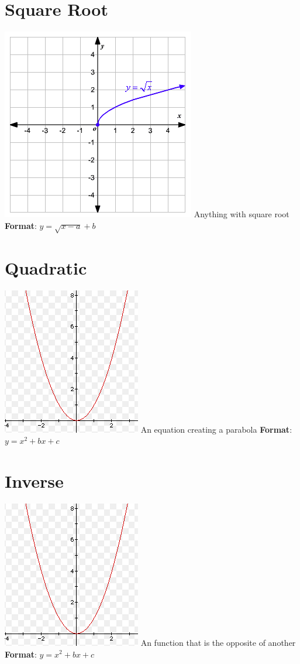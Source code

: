 \documentclass{article}
\begin{document}
	\section{Square Root}
	\includegraphics[scale=0.45]{pics/sqrtfunc.png}
	\newline \newline
	Anything with square root
	\newline \textbf{Format}: $y = \sqrt{x-a} + b$
	
	\section{Quadratic}
	\includegraphics[scale=0.45]{pics/quadfunc.png}
	\newline \newline
	An equation creating a parabola
	\newline \textbf{Format}: $y = x^2 + bx + c$
	
	\section{Inverse}
	\includegraphics[scale=0.45]{pics/quadfunc.png}
	\newline \newline
	An function that is the opposite of another
	\newline \textbf{Format}: $y = x^2 + bx + c$
	
\end{document}
